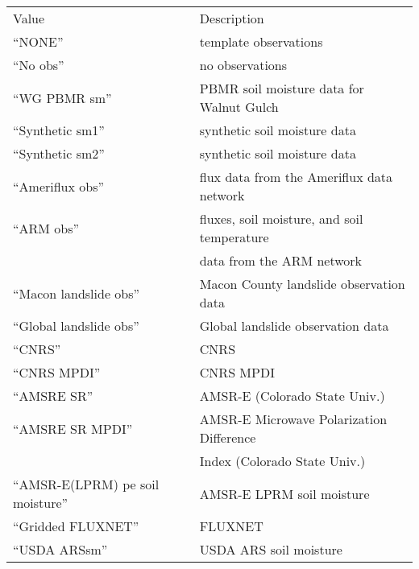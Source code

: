  \begin{tabular}{ll}
 Value                    & Description                               \\
 
 ``NONE''                 & template observations                     \\
 
 ``No obs''               & no observations                           \\
 
 ``WG PBMR sm''           & PBMR soil moisture data for Walnut Gulch  \\
 ``Synthetic sm1''        & synthetic soil moisture data              \\
 ``Synthetic sm2''        & synthetic soil moisture data              \\
 ``Ameriflux obs''        & flux data from the Ameriflux data network \\
 ``ARM obs''            & fluxes, soil moisture, and soil temperature \\
                          & data from the ARM network                 \\
 ``Macon landslide obs''  & Macon County landslide observation data   \\
 ``Global landslide obs'' & Global landslide observation data         \\
 ``CNRS''                 & CNRS                                      \\
 ``CNRS MPDI''            & CNRS MPDI                                 \\
 
 ``AMSRE SR''             & AMSR-E (Colorado State Univ.)             \\
 
 ``AMSRE SR MPDI''        & AMSR-E Microwave Polarization Difference  \\
                          & Index (Colorado State Univ.)              \\
 
 ``AMSR-E(LPRM) pe soil moisture'' & AMSR-E LPRM soil moisture        \\
 
 ``Gridded FLUXNET''      & FLUXNET                                   \\
 ``USDA ARSsm''           & USDA ARS soil moisture                    \\
 
 \end{tabular}

